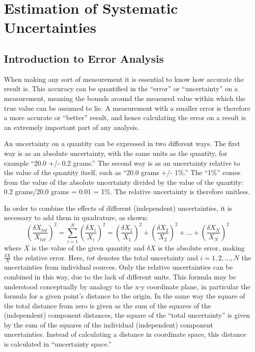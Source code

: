 \section{Estimation of Systematic Uncertainties}
\label{anMeth:Systs}


\subsection{Introduction to Error Analysis}
\label{anMeth:SystsIntro}

When making any sort of measurement it is essential 
to know how accurate the result is.  
This accuracy can be quantified in the 
``error'' or ``uncertainty'' 
on a measurement, 
meaning the bounds around the measured value 
within which the true value can be assumed to lie.  
A measurement with a smaller error is 
therefore a more accurate or ``better'' result, 
and hence calculating the error on a result is 
an extremely important part of 
any analysis.  

An uncertainty on a quantity can be 
expressed in two different ways.  
The first way is as an absolute uncertainty, 
with the same units as the quantity, 
for example ``20.0 +/- 0.2 grams.''  
The second way is as an uncertainty 
relative to the value of the quantity itself, 
such as ``20.0 grams +/- 1\%.''  
The ``1\%'' comes from the value of the absolute 
uncertainty divided by the value of the quantity: 
0.2 grams/20.0 grams = 0.01 = 1\%. 
The relative uncertainty is therefore unitless.  


In order to combine the effects of 
different (independent) uncertainties, 
it is necessary to add them 
in quadrature, as shown:
\[
\left(\frac{\delta X_{tot}}{X_{tot}}\right)^2 
= \sum_{i=1}^{N} \left(\frac{\delta X_i}{X_i}\right)^2 
= \left(\frac{\delta X_1}{X_1}\right)^2 
+ \left(\frac{\delta X_2}{X_2}\right)^2 
+ \ldots
+ \left(\frac{\delta X_N}{X_N}\right)^2 
\]
where 
$X$ is the value of the given quantity and 
$\delta X$ is the absolute error, 
making $\frac{\delta X}{X}$ the relative error.  
Here, $tot$ denotes the total uncertainty 
and $i=1,2,\ldots ,N$ the uncertainties from 
individual sources.  
Only the relative uncertainties 
can be combined in this way, 
due to the lack of different units.  
This formula may be understood 
conceptually by analogy to the 
x-y coordinate plane, in particular 
the formula for a given point's distance 
to the origin.  
In the same way the square of the total distance 
from zero is given as the sum of the squares 
of the (independent) component distances, 
the square of the ``total uncertainty'' 
is given by the sum of the squares of the 
individual (independent) component uncertainties.  
Instead of calculating a distance in %
coordinate space, 
this distance is calculated in 
``uncertainty space.''


